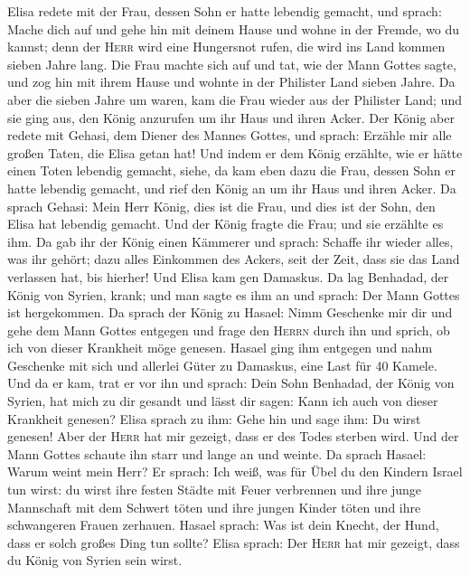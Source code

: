  Elisa redete mit der Frau, dessen Sohn er hatte lebendig
gemacht, und sprach: Mache dich auf und gehe hin mit deinem Hause und
wohne in der Fremde, wo du kannst; denn der \textsc{Herr} wird eine
Hungersnot rufen, die wird ins Land kommen sieben Jahre lang.
 Die Frau machte sich auf und tat, wie der Mann Gottes
sagte, und zog hin mit ihrem Hause und wohnte in der Philister Land
sieben Jahre.  Da aber die sieben Jahre um waren, kam die
Frau wieder aus der Philister Land; und sie ging aus, den König
anzurufen um ihr Haus und ihren Acker.  Der König aber
redete mit Gehasi, dem Diener des Mannes Gottes, und sprach: Erzähle mir
alle großen Taten, die Elisa getan hat!  Und indem er dem
König erzählte, wie er hätte einen Toten lebendig gemacht, siehe, da kam
eben dazu die Frau, dessen Sohn er hatte lebendig gemacht, und rief den
König an um ihr Haus und ihren Acker. Da sprach Gehasi: Mein Herr König,
dies ist die Frau, und dies ist der Sohn, den Elisa hat lebendig
gemacht.  Und der König fragte die Frau; und sie erzählte
es ihm. Da gab ihr der König einen Kämmerer und sprach: Schaffe ihr
wieder alles, was ihr gehört; dazu alles Einkommen des Ackers, seit der
Zeit, dass sie das Land verlassen hat, bis hierher!  Und
Elisa kam gen Damaskus. Da lag Benhadad, der König von Syrien, krank;
und man sagte es ihm an und sprach: Der Mann Gottes ist hergekommen.
 Da sprach der König zu Hasael: Nimm Geschenke mir dir und
gehe dem Mann Gottes entgegen und frage den \textsc{Herrn} durch ihn und
sprich, ob ich von dieser Krankheit möge genesen.  Hasael
ging ihm entgegen und nahm Geschenke mit sich und allerlei Güter zu
Damaskus, eine Last für 40 Kamele. Und da er kam, trat er vor ihn und
sprach: Dein Sohn Benhadad, der König von Syrien, hat mich zu dir
gesandt und lässt dir sagen: Kann ich auch von dieser Krankheit genesen?
 Elisa sprach zu ihm: Gehe hin und sage ihm: Du wirst
genesen! Aber der \textsc{Herr} hat mir gezeigt, dass er des Todes
sterben wird.  Und der Mann Gottes schaute ihn starr und
lange an und weinte.  Da sprach Hasael: Warum weint mein
Herr? Er sprach: Ich weiß, was für Übel du den Kindern Israel tun wirst:
du wirst ihre festen Städte mit Feuer verbrennen und ihre junge
Mannschaft mit dem Schwert töten und ihre jungen Kinder töten und ihre
schwangeren Frauen zerhauen.  Hasael sprach: Was ist dein
Knecht, der Hund, dass er solch großes Ding tun sollte? Elisa sprach:
Der \textsc{Herr} hat mir gezeigt, dass du König von Syrien sein wirst.
